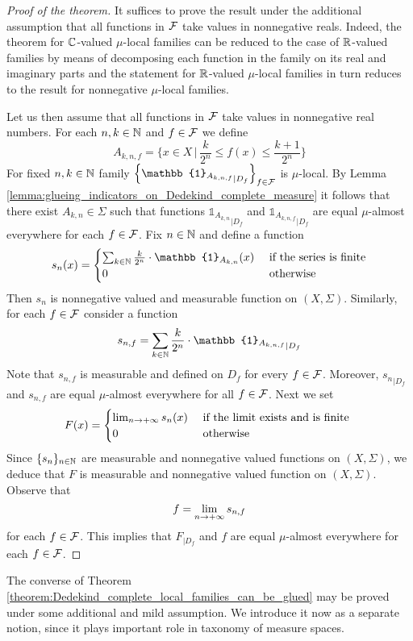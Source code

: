 \begin{proof}[Proof of the theorem]
  It suffices to prove the result under the additional assumption that all functions in ${\mathcal F}$ take values in nonnegative reals. Indeed, the theorem for ${\mathbb C}$-valued $\mu$-local families can be reduced to the case of ${\mathbb R}$-valued families by means of decomposing each function in the family on its real and imaginary parts and the statement for ${\mathbb R}$-valued $\mu$-local families in turn reduces to the result for nonnegative $\mu$-local families.

  Let us then assume that all functions in ${\mathcal F}$ take values in nonnegative real numbers. For each $n,k \in {\mathbb N}$ and $f \in {\mathcal F}$ we define
  $$A_{k,n,f} = \bigg\{x \in X \,\bigg|\,\frac{k}{2^n} \leq f(x) \leq \frac{k+1}{2^n} \bigg\}$$
  For fixed $n, k\in {\mathbb N}$ family $\left\{{\mathbb{1}_{A_{k,n,f}}}_{\mid D_f}\right\}_{f\in \cF}$ is $\mu$-local. By Lemma \ref{lemma:glueing_indicators_on_Dedekind_complete_measure} it follows that there exist $A_{k,n} \in \Sigma$ such that functions ${\mathbb{1}_{A_{k,n}}}_{\mid D_f}$ and ${\mathbb{1}_{A_{k,n,f}}}_{\mid D_f}$ are equal $\mu$-almost everywhere for each $f \in {\mathcal F}$. Fix $n \in {\mathbb N}$ and define a function
  $$s_n(x) = \begin{cases}
    \sum_{k\in \NN}\frac{k}{2^n}\cdot \mathbb{1}_{A_{k,n}}(x)&\mbox{ if the series is finite}\\
    0&\mbox{ otherwise }
  \end{cases}$$
  Then $s_n$ is nonnegative valued and measurable function on $(X,\Sigma)$. Similarly, for each $f \in {\mathcal F}$ consider a function
  $$s_{n,f} = \sum_{k\in \NN}\frac{k}{2^n}\cdot {\mathbb{1}_{A_{k,n,f}}}_{\mid D_f}$$
  Note that $s_{n,f}$ is measurable and defined on $D_f$ for every $f \in {\mathcal F}$. Moreover, ${s_n}_{\mid D_f}$ and $s_{n,f}$ are equal $\mu$-almost everywhere for all $f \in {\mathcal F}$. Next we set 
  $$F(x) = \begin{cases}
    \lim_{n\rightarrow +\infty}s_{n}(x)&\mbox{ if the limit exists and is finite }\\
    0&\mbox{ otherwise }
  \end{cases}$$
  Since $\{s_n\}_{n\in {\mathbb N}}$ are measurable and nonnegative valued functions on $(X,\Sigma)$, we deduce that $F$ is measurable and nonnegative valued function on $(X,\Sigma)$. Observe that
  $$f = \lim_{n\rightarrow +\infty}s_{n,f}$$
  for each $f \in {\mathcal F}$. This implies that $F_{\mid D_f}$ and $f$ are equal $\mu$-almost everywhere for each $f \in {\mathcal F}$.
\end{proof}
\noindent
The converse of Theorem \ref{theorem:Dedekind_complete_local_families_can_be_glued} may be proved under some additional and mild assumption. We introduce it now as a separate notion, since it plays important role in taxonomy of measure spaces.

